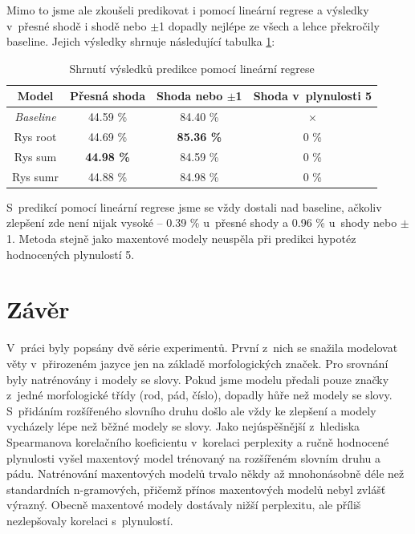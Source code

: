 \documentclass[12pt,a4paper]{report}
\def\chapwithtoc#1{
\chapter*{#1}
\addcontentsline{toc}{chapter}{#1}
}
\begin{document}
Mimo to jsme ale zkoušeli predikovat i pomocí lineární regrese a výsledky v~přesné shodě i shodě nebo $\pm$1 dopadly nejlépe ze všech a lehce překročily baseline. Jejich výsledky shrnuje následující tabulka \ref{tb:linreg}:

\begin{table}[!htbp]
\begin{center}
\begin{tabular}{|c|c|c|c|}
\hline
\textbf{\scriptsize Model} & \textbf{\scriptsize Přesná shoda} & \textbf{\scriptsize Shoda nebo $\pm$1} & \textbf{\scriptsize Shoda v~plynulosti 5} \\
\hline
\scriptsize \textit{Baseline} & 44.59 \% & 84.40 \% &  $\times$ \\
\hline
\scriptsize Rys root & 44.69 \% & \textbf{85.36 \%} & 0 \% \\
\hline
\scriptsize Rys sum &\textbf{ 44.98 \%} & 84.59 \% & 0 \% \\
\hline
\scriptsize Rys sumr & 44.88 \% & 84.98 \% & 0 \% \\
\hline
\end{tabular}
\caption{Shrnutí výsledků predikce pomocí lineární regrese}\label{tb:linreg}
\end{center}
\end{table}

S~predikcí pomocí lineární regrese jsme se vždy dostali nad baseline, ačkoliv zlepšení zde není nijak vysoké -- 0.39 \% u~přesné shody a 0.96 \% u~shody nebo $\pm$1. Metoda stejně jako maxentové modely neuspěla při predikci hypotéz hodnocených plynulostí 5.





% 

\chapwithtoc{Závěr}
V~práci byly popsány dvě série experimentů. První z~nich se snažila modelovat věty v~přirozeném jazyce jen na základě morfologických značek. Pro srovnání byly natrénovány i modely se slovy. Pokud jsme modelu předali pouze značky z~jedné morfologické třídy (rod, pád, číslo), dopadly hůře než modely se slovy. S~přidáním rozšířeného slovního druhu došlo ale vždy ke zlepšení a modely vycházely lépe než běžné modely se slovy. Jako nejúspěšnější z~hlediska Spearmanova korelačního koeficientu v~korelaci perplexity a ručně hodnocené plynulosti vyšel maxentový model trénovaný na rozšířeném slovním druhu a pádu. Natrénování maxentových modelů trvalo někdy až mnohonásobně déle než standardních n-gramových, přičemž přínos maxentových modelů nebyl zvlášť výrazný. Obecně maxentové modely dostávaly nižší perplexitu, ale příliš nezlepšovaly korelaci s~plynulostí.
\end{document}
